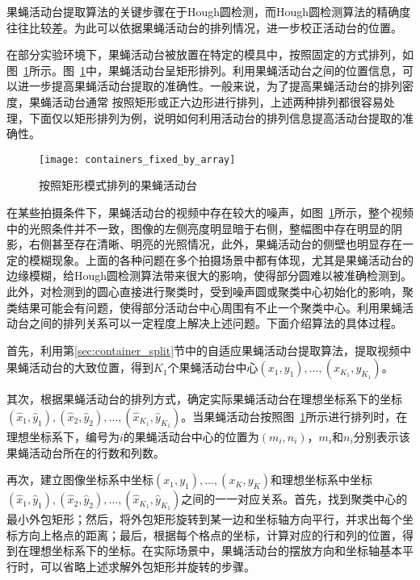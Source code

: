果蝇活动台提取算法的关键步骤在于Hough圆检测，而Hough圆检测算法的精确度往往比较差。为此可以依据果蝇活动台的排列情况，进一步校正活动台的位置。

在部分实验环境下，果蝇活动台被放置在特定的模具中，按照固定的方式排列，如图~\ref{fig:containers_fixed_by_array}所示。图~\ref{fig:containers_fixed_by_array}中，果蝇活动台呈矩形排列。利用果蝇活动台之间的位置信息，可以进一步提高果蝇活动台提取的准确性。一般来说，为了提高果蝇活动台的排列密度，果蝇活动台通常 按照矩形或正六边形进行排列，上述两种排列都很容易处理，下面仅以矩形排列为例，说明如何利用活动台的排列信息提高活动台提取的准确性。

\begin{figure}[htb]
\centering
\texttt{[image: containers\_fixed\_by\_array]}
\caption{按照矩形模式排列的果蝇活动台}
\label{fig:containers_fixed_by_array}
\end{figure}

在某些拍摄条件下，果蝇活动台的视频中存在较大的噪声，如图~\ref{fig:containers_fixed_by_array}所示，整个视频中的光照条件并不一致，图像的左侧亮度明显暗于右侧，整幅图中存在明显的阴影，右侧甚至存在清晰、明亮的光照情况，此外，果蝇活动台的侧壁也明显存在一定的模糊现象。上面的各种问题在多个拍摄场景中都有体现，尤其是果蝇活动台的边缘模糊，给Hough圆检测算法带来很大的影响，使得部分圆难以被准确检测到。此外，对检测到的圆心直接进行聚类时，受到噪声圆或聚类中心初始化的影响，聚类结果可能会有问题，使得部分活动台中心周围有不止一个聚类中心。利用果蝇活动台之间的排列关系可以一定程度上解决上述问题。下面介绍算法的具体过程。

首先，利用第\ref{sec:container_split}节中的自适应果蝇活动台提取算法，提取视频中果蝇活动台的大致位置，得到$K_1$个果蝇活动台中心$(x_1,y_1), \ldots, (x_{K_1},y_{K_1})$。

其次，根据果蝇活动台的排列方式，确定实际果蝇活动台在理想坐标系下的坐标$(\hat{x}_1, \hat{y}_1), (\hat{x}_2, \hat{y}_2), \ldots, (\hat{x}_{K_1}, \hat{y}_{K_1})$。当果蝇活动台按照图~\ref{fig:containers_fixed_by_array}所示进行排列时，在理想坐标系下，编号为$i$的果蝇活动台中心的位置为$(m_i, n_i)$，$m_i$和$n_i$分别表示该果蝇活动台所在的行数和列数。

再次，建立图像坐标系中坐标$(x_1,y_1),\ldots,(x_K,y_K)$和理想坐标系中坐标$(\hat{x}_1, \hat{y}_1), (\hat{x}_2, \hat{y}_2), \ldots, (\hat{x}_{K_1}, \hat{y}_{K_1})$之间的一一对应关系。首先，找到聚类中心的最小外包矩形；然后，将外包矩形旋转到某一边和坐标轴方向平行，并求出每个坐标方向上格点的距离；最后，根据每个格点的坐标，计算对应的行和列的位置，得到在理想坐标系下的坐标。在实际场景中，果蝇活动台的摆放方向和坐标轴基本平行时，可以省略上述求解外包矩形并旋转的步骤。

